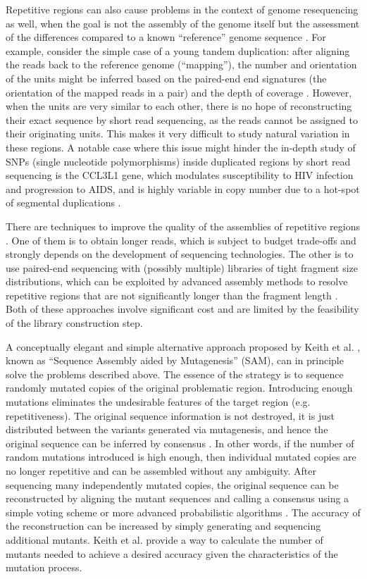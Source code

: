 \documentclass[10pt]{article}
\newcommand{\blue}[1]{{\color{blue} #1}}
\begin{document}
Repetitive regions can also cause problems in the context of genome resequencing as well, when the goal is not the assembly of the genome itself but the assessment of the differences compared to a known ``reference'' genome sequence \cite{Nielsen11}. For example, consider the simple case of a young tandem duplication: after aligning the reads back to the reference genome (``mapping''), the number and orientation of the units might be inferred based on the paired-end end signatures (the orientation of the mapped reads in a pair) and the depth of coverage \cite{Medvedev2009}. 
However, when the units are very similar to each other, there is no hope \blue{of reconstructing} their exact sequence by short read sequencing, as the reads cannot be assigned to their originating units.
This makes it very difficult to study natural variation in these regions.
A notable case where this issue might hinder the in-depth study of SNPs (single nucleotide polymorphisms) inside duplicated regions by short read sequencing is the CCL3L1 gene, which modulates susceptibility to HIV infection and progression to AIDS, and is highly variable in copy number due to a hot-spot of segmental duplications \cite{Bailey06, Liu10}.

There are techniques to improve the quality of the assemblies of repetitive regions \cite{Treangen11}. One of them is to obtain longer reads, which is subject to budget trade-offs and strongly depends on the development of sequencing technologies. The other is to use paired-end sequencing with (possibly multiple) libraries of tight fragment size distributions, which can be exploited by advanced assembly methods to resolve repetitive regions that are not significantly longer than the fragment length \cite{Zerbino2009}.
Both of these approaches involve significant cost and are limited by the feasibility of the library construction step.

A conceptually elegant and simple alternative approach proposed by Keith et al. \cite{Keith2004, Mitchelson2011}, known as ``Sequence Assembly aided by Mutagenesis'' (SAM), can in principle solve the problems described above. The essence of the strategy is to sequence randomly mutated copies of the original problematic region. Introducing enough mutations eliminates the undesirable features of the target region (e.g. repetitiveness). The original sequence information is not destroyed, it is just distributed between the variants generated via mutagenesis, and hence the original sequence can be inferred by consensus \cite{Keith2004}.
In other words, if the number of random mutations introduced is high enough, then individual mutated copies are no longer repetitive and can be assembled without any ambiguity. After sequencing many independently mutated copies, the original sequence can be reconstructed by aligning the mutant sequences and calling a consensus using a simple voting scheme \cite{Keith2007} or more advanced probabilistic algorithms \cite{Keith02,Keith2004a}. The accuracy of the reconstruction can be increased by simply generating and sequencing additional mutants. Keith et al. \cite{Keith2004a} provide a way to calculate the number of mutants needed to achieve a desired accuracy given the characteristics of the mutation process.
\end{document}
